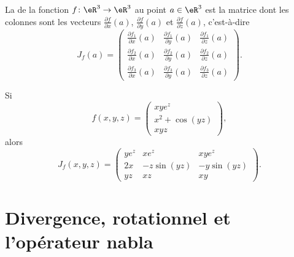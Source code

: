 La  de la fonction \( f\colon \eR^3\to \eR^3\) au point \( a\in\eR^3\) est la matrice dont les colonnes sont les vecteurs \( \frac{ \partial f }{ \partial x }(a)\), \( \frac{ \partial f }{ \partial y }(a)\) et \( \frac{ \partial f }{ \partial z }(a)\), c'est-à-dire
\begin{equation}
	J_f(a)=\begin{pmatrix}
		\frac{ \partial f_1 }{ \partial x }(a) & \frac{ \partial f_1 }{ \partial y }(a) & \frac{ \partial f_1 }{ \partial z }(a) \\
		\frac{ \partial f_2 }{ \partial x }(a) & \frac{ \partial f_2 }{ \partial y }(a) & \frac{ \partial f_2 }{ \partial z }(a) \\
		\frac{ \partial f_3 }{ \partial x }(a) & \frac{ \partial f_3 }{ \partial y }(a) & \frac{ \partial f_3 }{ \partial z }(a)
	\end{pmatrix}.
\end{equation}

\begin{example}
	Si
	\begin{equation}
		f(x,y,z)=\begin{pmatrix}
			xy e^{z}     \\
			x^2+\cos(yz) \\
			xyz
		\end{pmatrix},
	\end{equation}
	alors
	\begin{equation}
		J_f(x,y,z)=\begin{pmatrix}
			ye^z & xe^z       & xye^z      \\
			2x   & -z\sin(yz) & -y\sin(yz) \\
			yz   & xz         & xy
		\end{pmatrix}.
	\end{equation}
\end{example}

\section{Divergence, rotationnel et l'opérateur nabla}

